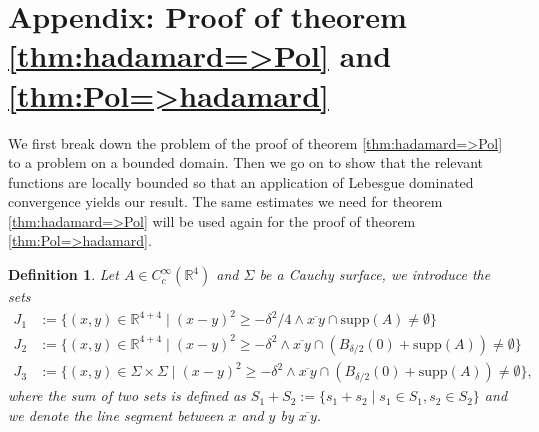 \documentclass[a4paper,11pt]{article}
\newtheorem{de}{Definition}
\begin{document}



\section{Appendix: Proof of theorem \ref{thm:hadamard=>Pol} and \ref{thm:Pol=>hadamard}}

We first break down the problem of the proof of theorem \ref{thm:hadamard=>Pol} to a problem on a bounded domain. Then we go on 
to show that the relevant functions are locally bounded so that an application of Lebesgue dominated convergence yields our result.
The same estimates we need for theorem \ref{thm:hadamard=>Pol} will be used again for the proof of theorem \ref{thm:Pol=>hadamard}.

\begin{de} Let \(A\in C_c^\infty(\mathbb{R}^4)\) and \(\Sigma\) be a Cauchy surface, we introduce the sets
\begin{align}
J_1&:=\{(x,y)\in\mathbb{R}^{4+4}\mid (x-y)^2\ge -\delta^2/4 \wedge \overline{x~y} \cap \mathrm{supp}(A)\neq \emptyset\}\\
J_2&:=\{(x,y)\in\mathbb{R}^{4+4}\mid (x-y)^2\ge -\delta^2 \wedge \overline{x~y} \cap \left(B_{\delta/2}(0)+\mathrm{supp}(A)\right)\neq \emptyset\}\\
J_3&:=\{(x,y)\in \Sigma \times \Sigma \mid (x-y)^2 \ge-\delta^2\wedge \overline{x ~ y} \cap \left(B_{\delta/2}(0)+\mathrm{supp}(A) \right)\neq \emptyset \},
\end{align}
where the sum of two sets is defined as \(S_1+S_2:=\{s_1+s_2\mid s_1\in S_1, s_2\in S_2\}\) and we denote the line segment between \(x\) and \(y\) by \(\overline{x~y}\). 
\end{de}
\end{document}
